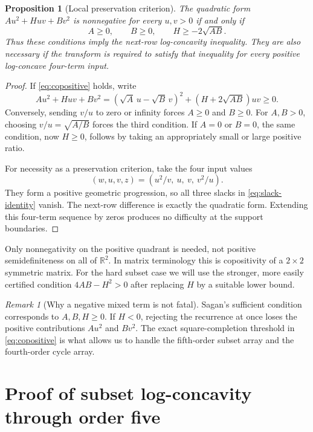 \documentclass[11pt,a4paper]{article}
\numberwithin{equation}{section}
\newtheorem{proposition}[proposition]{Proposition}
\theoremstyle{definition}
\theoremstyle{remark}
\newtheorem{remark}[remark]{Remark}
\newcommand{\R}{\mathbb R}
\begin{document}
\begin{proposition}[Local preservation criterion]\label{prop:copositive}
The quadratic form $Au^2+Huv+Bv^2$ is nonnegative for every $u,v>0$
if and only if
\begin{equation}\label{eq:copositive}
 A\ge0,\qquad B\ge0,\qquad H\ge-2\sqrt{AB}.
\end{equation}
Thus these conditions imply the next-row log-concavity inequality.
They are also necessary if the transform is required to satisfy that
inequality for every positive log-concave four-term input.
\end{proposition}
\begin{proof}
If \eqref{eq:copositive} holds, write
\[
 Au^2+Huv+Bv^2=(\sqrt A\,u-\sqrt B\,v)^2
                         +(H+2\sqrt{AB})uv\ge0.
\]
Conversely, sending $v/u$ to zero or infinity forces $A\ge0$ and $B\ge0$.
For $A,B>0$, choosing $v/u=\sqrt{A/B}$ forces the third condition.
If $A=0$ or $B=0$, the same condition, now $H\ge0$, follows by taking
an appropriately small or large positive ratio.

For necessity as a preservation criterion, take the four input values
\[
 (w,u,v,z)=(u^2/v,\ u,\ v,\ v^2/u).
\]
They form a positive geometric progression, so all three slacks in
\eqref{eq:slack-identity} vanish. The next-row difference is exactly the
quadratic form. Extending this four-term sequence by zeros produces
no difficulty at the support boundaries.
\end{proof}

Only nonnegativity on the positive quadrant is needed, not positive
semidefiniteness on all of $\R^2$. In matrix terminology this is
copositivity of a $2\times2$ symmetric matrix. For the hard subset case we
will use the stronger, more easily certified condition
$4AB-H^2>0$ after replacing $H$ by a suitable lower bound.

\begin{remark}[Why a negative mixed term is not fatal]
Sagan's sufficient condition corresponds to $A,B,H\ge0$.
If $H<0$, rejecting the recurrence at once loses the positive contributions
$Au^2$ and $Bv^2$. The exact square-completion threshold in
\eqref{eq:copositive} is what allows us to handle the fifth-order subset
array and the fourth-order cycle array.
\end{remark}

\section{Proof of subset log-concavity through order five}\label{sec:subset-proof}
\end{document}
